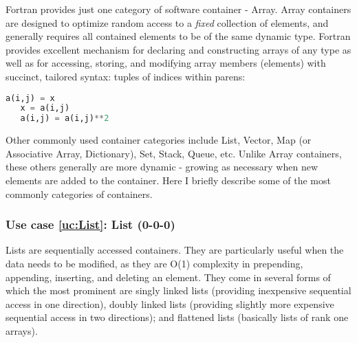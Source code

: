 \documentclass{article}
\newcounter{usecase}
\newcommand{\newusecase}[2]{
\refstepcounter{usecase}\label{uc:#1}
\subsubsection{Use case \ref{uc:#1}: #1 (#2)}}
\begin{document}
Fortran provides just one category of software container - Array.   Array containers are designed to optimize random access to a  {\em fixed} collection of elements, and generally requires all   contained elements to be of the same dynamic type.  Fortran   provides excellent mechanism for declaring and constructing arrays   of any type as well as for accessing, storing, and modifying array    members (elements) with succinct, tailored syntax: tuples of indices within parens:
   
\begin{lstlisting}[language=Python]
   a(i,j) = x
   x = a(i,j)
   a(i,j) = a(i,j)**2
\end{lstlisting}


 Other commonly used container categories include List, Vector, Map (or Associative Array, Dictionary), Set, Stack, Queue, etc.   Unlike Array containers, these others generally are more dynamic -   growing as necessary when new elements are added to the container.   Here I briefly describe some of the most commonly categories of   containers.

\newusecase{List}{0-0-0} 
Lists are sequentially accessed containers. They are
particularly useful when the data needs to be modified, as they are
O(1) complexity in prepending, appending, inserting, and deleting an
element. They come in several forms of which the most prominent are
singly linked lists (providing inexpensive sequential access in one
direction), doubly linked lists (providing slightly more expensive
sequential access in two directions); and flattened lists (basically
lists of rank one arrays).
\end{document}
